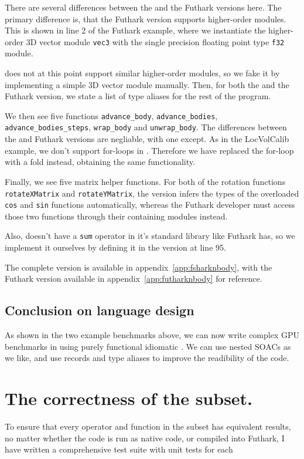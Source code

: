 There are several differences between the \fshark{} and the Futhark versions
here. The primary difference is, that the Futhark version supports higher-order
modules. This is shown in line 2 of the Futhark example, where we instantiate
the higher-order 3D vector module \texttt{vec3} with the single precision floating point
type \texttt{f32} module.

\fshark{} does not at this point support similar higher-order modules, so we
fake it by implementing a simple 3D vector module manually.
Then, for both the \fshark{} and the Futhark version, we state a list of type
aliases for the rest of the program.

We then see five functions \texttt{advance\_body}, \texttt{advance\_bodies},
\texttt{advance\_bodies\_steps}, \texttt{wrap\_body} and \texttt{unwrap\_body}.
The differences between the \fshark{} and Futhark versions are negliable, with
one except.
As in the LocVolCalib example, we don't support for-loops in \fshark{}.
Therefore we have replaced the for-loop with a fold instead, obtaining the same functionality. 

Finally, we see five matrix helper functions. For both of the rotation functions
\texttt{rotateXMatrix} and \texttt{rotateYMatrix}, the \fshark{} version infers
the types of the overloaded \texttt{cos} and \texttt{sin} functions
automatically, whereas the Futhark developer must access those two functions
through their containing modules instead.

Also, \fshark{} doesn't have a \texttt{sum} operator in it's standard library
like Futhark has, so we implement it ourselves by defining it in the \fshark{}
version at line 95.

The complete \fshark{} version is available in
appendix~\ref{app:fsharknbody}, with the Futhark version available in
appendix~\ref{app:futharknbody} for reference.


\subsection{Conclusion on \fshark{} language design}
As shown in the two example benchmarks above, we can now write complex GPU
benchmarks in \fsharp{} using purely functional idiomatic \fsharp{}.
We can use nested SOACs as we like, and use records and type aliases to improve
the readibility of the code.

\section{The correctness of the \fshark{} subset.}
\label{subsec:fsharkcorrectness}
To ensure that every operator and function in the \fshark{} subset has
equivalent results, no matter whether the \fshark{} code is run as native
\fsharp{} code, or compiled into Futhark, I have written a comprehensive test suite with unit
tests for each 

